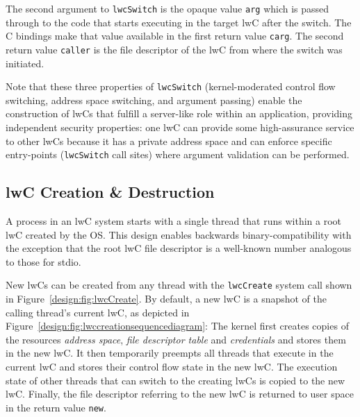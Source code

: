 \documentclass[10pt,twocolumn,a4paper]{article}
\begin{document}
The second argument to \lstinline{lwcSwitch} is the opaque value \lstinline{arg} which is passed through to the code that starts executing in the target lwC after the switch.
The C bindings make that value available in the first return value \lstinline{carg}.
The second return value \lstinline{caller} is the file descriptor of the lwC from where the switch was initiated.
\cite{lwcpaper}

Note that these three properties of \lstinline{lwcSwitch} (kernel-moderated control flow switching, address space switching, and argument passing) enable the construction of lwCs that fulfill a server-like role within an application, providing independent security properties:
one lwC can provide some high-assurance service to other lwCs because it has a private address space and can enforce specific entry-points (\lstinline{lwcSwitch} call sites) where argument validation can be performed.


\subsection{lwC Creation \& Destruction}\label{design:createdestroy}
A process in an lwC system starts with a single thread that runs within a root lwC created by the OS.
This design enables backwards binary-compatibility with the exception that the root lwC file descriptor is a well-known number analogous to those for stdio.
\cite{lwcpaper}

New lwCs can be created from any thread with the \lstinline{lwcCreate} system call shown in Figure~\ref{design:fig:lwcCreate}.
By default, a new lwC is a snapshot of the calling thread's current lwC, as depicted in Figure~\ref{design:fig:lwccreationsequencediagram}:
The kernel first creates copies of the resources \textit{address space}, \textit{file descriptor table} and \textit{credentials} and stores them in the new lwC.
It then temporarily preempts all threads that execute in the current lwC and stores their control flow state in the new lwC.
The execution state of other threads that can switch to the creating lwCs is copied to the new lwC.
Finally, the file descriptor referring to the new lwC is returned to user space in the return value \lstinline{new}.
\cite{lwcpaper}
\end{document}
